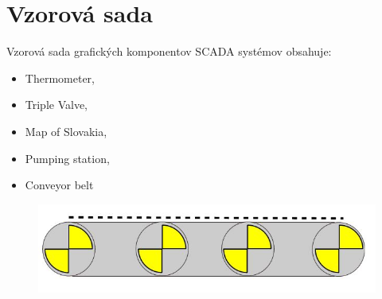 \chapter{Vzorová sada}

Vzorová sada grafických komponentov SCADA systémov obsahuje:
\begin{itemize}
	\item Thermometer,
	\item Triple Valve, 
	\item Map of Slovakia,
	\item Pumping station, 
	\item Conveyor belt 
	
\end{itemize}

\begin{figure}[H]
\centering
\includegraphics[width=0.7\linewidth]{obrazky/belt}
\caption{}
\label{fig:belt}
\end{figure}


